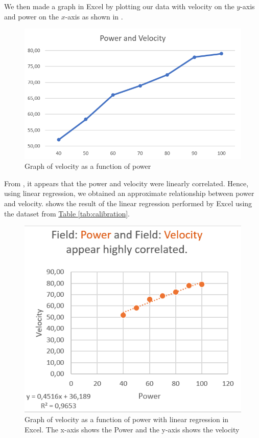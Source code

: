 We then made a graph in Excel by plotting our data with velocity on the $y$-axis and power on the $x$-axis as shown in .

\begin{figure}[h!]
		\centering
	\includegraphics[width=1\linewidth]{figures/velocity_and_power}
	\caption[Graph of velocity as function of power]{Graph of velocity as a function of power}
	\label{fig:graphvelpow}
\end{figure}

From , it appears that the power and velocity were linearly correlated. Hence, using linear regression, we obtained an approximate relationship between power and velocity.  shows the result of the linear regression performed by Excel using the dataset from \hyperref[tab:calibration]{Table \ref{tab:calibration}}.

\clearpage
\begin{figure}[h!]
	\centering
	\includegraphics[width=1\linewidth]{figures/function_of_power}
	\caption{Graph of velocity as a function of power with linear regression in Excel. The x-axis shows the Power and the y-axis shows the velocity}
	\label{fig:functionofpower}
\end{figure}

